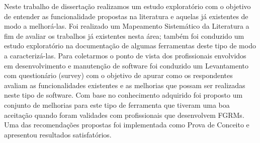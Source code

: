 Neste trabalho de dissertação realizamos um estudo exploratório com o objetivo
de entender as funcionalidade propostas na literatura e aquelas já existentes de
modo a melhorá-las. Foi realizado um Mapeamento Sistemático da Literatura a fim
de avaliar os trabalhos já existentes nesta área; também foi conduzido um estudo
exploratório na documentação de algumas ferramentas deste tipo de modo a
caracterizá-las. Para coletarmos o ponto de vista dos profissionais envolvidos
em desenvolvimento e manutenção de software foi conduzido um Levantamento com
questionário (survey) com o objetivo de apurar como os respondentes  avaliam as
funcionalidades existentes e as melhorias que possam ser realizadas neste tipo
de software. Com base no conhecimento adquirido foi proposto um conjunto de
melhorias para este tipo de ferramenta que tiveram uma boa aceitação quando
foram validades com profissionais que desenvolvem FGRMs. Uma das recomendações
propostas foi implementada como Prova de Conceito e apresentou resultados
satisfatórios.

